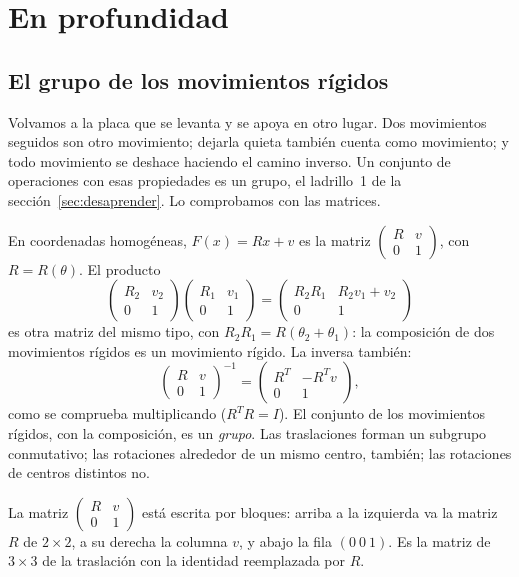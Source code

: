 \section{En profundidad}

\subsection{El grupo de los movimientos rígidos}\label{sec:grupo-rigidos}

Volvamos a la placa que se levanta y se apoya en otro lugar. Dos movimientos seguidos son otro
movimiento; dejarla quieta también cuenta como movimiento; y todo movimiento se deshace
haciendo el camino inverso. Un conjunto de operaciones con esas propiedades es un grupo, el
ladrillo~1 de la sección~\ref{sec:desaprender}. Lo comprobamos con las matrices.

En coordenadas homogéneas, \(F(x)=Rx+v\) es la matriz
\(\left(\begin{smallmatrix}R&v\\0&1\end{smallmatrix}\right)\), con \(R=R(\theta)\). El producto
\[
\begin{pmatrix}R_2&v_2\\0&1\end{pmatrix}\begin{pmatrix}R_1&v_1\\0&1\end{pmatrix}
=\begin{pmatrix}R_2R_1&R_2v_1+v_2\\0&1\end{pmatrix}
\]
es otra matriz del mismo tipo, con \(R_2R_1=R(\theta_2+\theta_1)\): la composición de dos
movimientos rígidos es un movimiento rígido. La inversa también:
\[
\begin{pmatrix}R&v\\0&1\end{pmatrix}^{-1}
=\begin{pmatrix}R^T&-R^Tv\\0&1\end{pmatrix},
\]
como se comprueba multiplicando (\(R^TR=I\)). El conjunto de los movimientos rígidos, con la
composición, es un \emph{grupo}. Las traslaciones forman un subgrupo conmutativo; las
rotaciones alrededor de un mismo centro, también; las rotaciones de centros distintos no.

La matriz \(\left(\begin{smallmatrix}R&v\\0&1\end{smallmatrix}\right)\) está escrita por
bloques: arriba a la izquierda va la matriz \(R\) de \(2\times2\), a su derecha la columna
\(v\), y abajo la fila \((0\ 0\ 1)\). Es la matriz de \(3\times3\) de la traslación con la
identidad reemplazada por \(R\).

